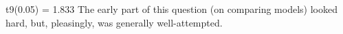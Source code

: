 \documentclass[a4paper,12pt]{article}
\begin{document}
t9(0.05) = 1.833
The early part of this question (on comparing models) looked hard, but,
pleasingly, was generally well-attempted.
\end{document}
